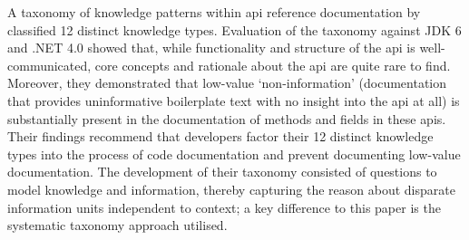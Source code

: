 A taxonomy of knowledge patterns within \gls{api} reference documentation by \citet{Maalej:2013uu} classified 12 distinct knowledge types. Evaluation of the taxonomy against JDK 6 and .NET 4.0 showed that, while functionality and structure of the \gls{api} is well-communicated, core concepts and rationale about the \gls{api} are quite rare to find. Moreover, they demonstrated that low-value `non-information' (documentation that provides uninformative boilerplate text with no insight into the \gls{api} at all) is substantially present in the documentation of methods and fields in these \glspl{api}. Their findings recommend that developers factor their 12 distinct knowledge types into the process of code documentation and prevent documenting low-value documentation. The development of their taxonomy consisted of questions to model knowledge and information, thereby capturing the reason about disparate information units independent to context; a key difference to this paper is the systematic taxonomy approach utilised.



%



